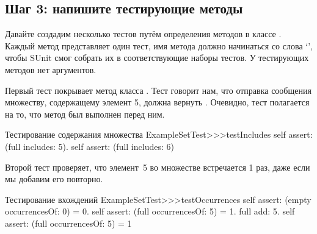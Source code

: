 \documentclass[a4paper,10pt,twoside]{book}
\begin{document}
\subsection{Шаг 3: напишите тестирующие методы}

Давайте создадим несколько тестов путём определения методов в классе .
Каждый метод представляет один тест, имя метода должно начинаться со слова `',
чтобы SUnit смог собрать их в соответствующие наборы тестов. У тестирующих методов нет аргументов.  

Первый тест  покрывает метод  класса .
Тест говорит нам, что отправка сообщения  множеству,
содержащему элемент 5, должна вернуть .
Очевидно, тест полагается на то, что метод  был выполнен перед ним.

\begin{method}[testIncludes]{Тестирование содержания множества}
ExampleSetTest>>>testIncludes
	self assert: (full includes: 5).
	self assert: (full includes: 6)
\end{method}

Второй тест  проверяет, что элемент~5 во множестве 
встречается 1 раз, даже если мы добавим его повторно. 

\begin{method}[testOccurrences]{Тестирование вхождений}
ExampleSetTest>>>testOccurrences
	self assert: (empty occurrencesOf: 0) = 0.
	self assert: (full occurrencesOf: 5) = 1.
	full add: 5.
	self assert: (full occurrencesOf: 5) = 1
\end{method}
\end{document}
